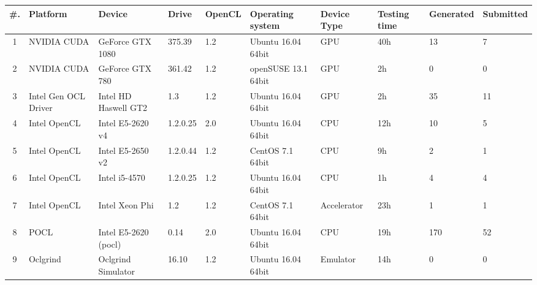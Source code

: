 \begin{tabular}{ clllllllll }
\toprule
\textbf{\#. } & \textbf{Platform} & \textbf{Device} & \textbf{Drive} & \textbf{OpenCL} & 
\textbf{Operating system} & \textbf{Device Type} & \textbf{Testing time} &
\textbf{Generated} & \textbf{Submitted} \\
\midrule

1 & NVIDIA CUDA & GeForce GTX 1080 & 375.39 & 1.2 & Ubuntu 16.04 64bit & GPU & 40h & 13 & 7 \\
2 & NVIDIA CUDA & GeForce GTX 780 & 361.42 & 1.2 & openSUSE  13.1 64bit & GPU & 2h & 0 & 0 \\
3 & Intel Gen OCL Driver & Intel HD Haswell GT2 & 1.3 & 1.2 & Ubuntu 16.04 64bit & GPU & 2h & 35 & 11 \\
4 & Intel OpenCL & Intel E5-2620 v4 & 1.2.0.25 & 2.0 & Ubuntu 16.04 64bit & CPU & 12h & 10 & 5 \\
5 & Intel OpenCL & Intel E5-2650 v2 & 1.2.0.44 & 1.2 & CentOS 7.1 64bit & CPU & 9h & 2 & 1 \\
6 & Intel OpenCL & Intel i5-4570 & 1.2.0.25 & 1.2 & Ubuntu 16.04 64bit & CPU & 1h & 4 & 4 \\
7 & Intel OpenCL & Intel Xeon Phi & 1.2 & 1.2 & CentOS 7.1 64bit & Accelerator & 23h & 1 & 1 \\
8 & POCL & Intel E5-2620 (pocl) & 0.14 & 2.0 & Ubuntu 16.04 64bit & CPU & 19h & 170 & 52 \\
9 & Oclgrind & Oclgrind Simulator & 16.10 & 1.2 & Ubuntu 16.04 64bit & Emulator & 14h & 0 & 0 \\

\bottomrule
\end{tabular}

